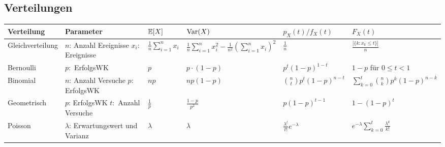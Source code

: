 \renewcommand*{\arraystretch}{2}
\begin{center}
\begin{table}
	\subsection{Verteilungen}
	
		\begin{tabularx}{\textwidth}{llXXXX}
			\toprule
			Verteilung       & Parameter                                   & \( \mathbb{E}[X] \) & \( \text{Var}(X) \)       & \( p_X(t)/f_X(t) \)         & \( F_X(t) \)                     \\
			\midrule
			Gleichverteilung & \makecell[l]{\( n \): Anzahl Ereignisse                                                                                                   \\ \( x_i \): Ereignisse} & \( \frac{1}{n} \sum_{i=1}^{n} x_i \) & \( \frac{1}{n} \sum_{i=1}^{n} x_i^2 - \frac{1}{n^2} \left(\sum_{i=1}^{n} x_i \right)^2 \) & \( \frac{1}{n} \) & \( \frac{|\{k:x_k \leq t\}|}{n} \) \\
	
			Bernoulli        & \( p: \) ErfolgsWK                          & \( p \)     & \( p \cdot (1-p) \) & \( p^t(1-p)^{1-t} \) & \( 1-p \) für \( 0 \leq t < 1 \) \\
	
			Binomial         & \makecell[l] {\( n \): Anzahl Versuche                                                                                                    \\ \( p: \) ErfolgsWK } & \( np \) & \( np(1-p) \) & \( \binom{n}{t}p^t(1-p)^{n-t} \) & \( \sum_{k=0}^{t} \binom{n}{k} p^k(1-p)^{n-k} \)  \\
	
			Geometrisch      & \makecell[l] { \( p \): ErfolgsWK                                                                                                         \\ \( t: \) Anzahl Versuche} & \( \frac{1}{p} \) & \( \frac{1-p}{p^2} \) & \( p(1-p)^{t-1} \) & \( 1-(1-p)^t\) \\
	
			Poisson          & \makecell[l]{ \( \lambda \): Erwartungswert                                                                                               \\ und Varianz} & \( \lambda \) & \( \lambda \) & \( \frac{\lambda^t}{t!}e^{-\lambda} \) & \( e^{-\lambda} \sum_{k=0}^{t} \frac{\lambda^{k}}{k!} \) \\
			

\end{tabularx}
\end{table}
\end{center}
